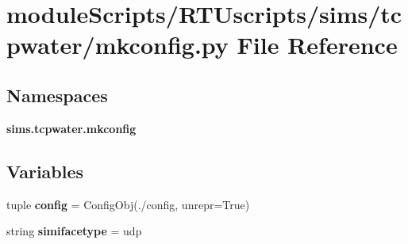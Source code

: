 \section{module\+Scripts/\+R\+T\+Uscripts/sims/tcpwater/mkconfig.py File Reference}
\label{tcpwater_2mkconfig_8py}
\subsection*{Namespaces}
\begin{DoxyCompactItemize}
\item 
 {\bf sims.\+tcpwater.\+mkconfig}
\end{DoxyCompactItemize}
\subsection*{Variables}
\begin{DoxyCompactItemize}
\item 
tuple {\bf config} = Config\+Obj(\textquotesingle{}./config\textquotesingle{}, unrepr=True)
\item 
string {\bf simifacetype} = \textquotesingle{}udp\textquotesingle{}
\end{DoxyCompactItemize}
